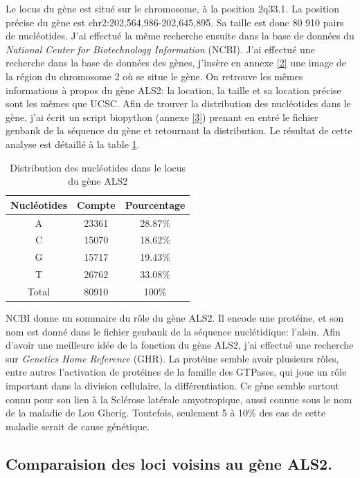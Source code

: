 \documentclass[10.8pt]{article} %
\begin{document}
Le locus du gène est situé sur le chromosome, à la position 2q33.1. La position précise du gène est chr2:202,564,986-202,645,895.
Sa taille est donc 80 910 pairs de nucléotides. J'ai effectué la même recherche ensuite dans la base de données du
\emph{National Center for Biotechnology Information} (NCBI). J'ai effectué une recherche dans la base de données des gènes,
j'insère en annexe \ref{2}  une image de la région du chromosome 2 où se situe le gène. On retrouve les mêmes informations
à propos du gène ALS2: la location, la taille et sa location précise sont les mêmes que UCSC. Afin de trouver la distribution
des nucléotides dans le gène, j'ai écrit un script biopython (annexe \ref{3}) prenant en entré le fichier genbank de la séquence
du gène et retournant la distribution. Le résultat de cette analyse est détaillé à la table \ref{tab:first}.
\begin{table}[b]
{\small
\centering
\begin{tabular}{|c|c|c|}

 \hline
 Nucléotides & Compte & Pourcentage \\
 \hline
 A & 23361 & 28.87\% \\
 \hline
  C & 15070 & 18.62\% \\
 \hline
  G & 15717 & 19.43\% \\
 \hline
  T & 26762 & 33.08\% \\
 \hline
  Total & 80910 & 100\% \\
 \hline
 \end{tabular}
\caption{{\small Distribution des nucléotides dans le locus du gène ALS2}}
\label{tab:first}
}
\end{table}

NCBI donne un sommaire du rôle du gène ALS2. Il encode une protéine, et son nom est donné dans le fichier genbank de la séquence
nuclétidique: l'alsin. Afin d'avoir une meilleure idée de la fonction du gène ALS2, j'ai effectué une recherche sur 
\emph{Genetics Home Reference} (GHR). La protéine semble avoir plusieurs rôles, entre autres l'activation de 
protéines de la famille des GTPases, qui joue un rôle important dans la division cellulaire, la différentiation. Ce gène semble surtout
connu pour son lien à la Sclérose latérale amyotropique, aussi connue sous le nom de la maladie de Lou Gherig. 
Toutefois, seulement 5 à 10\% des cas de cette maladie serait de cause génétique. %

\subsection[Loci voisins du gène ALS2]{Comparaision des loci voisins au gène ALS2.}
\end{document}
